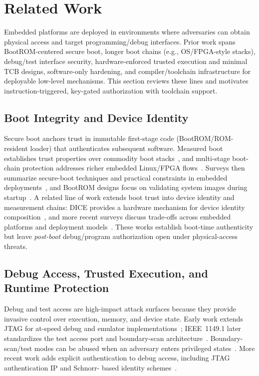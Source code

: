 \section{Related Work}
\label{sec:relatedwork}

Embedded platforms are deployed in environments where adversaries can obtain physical
access and target programming/debug interfaces. Prior work spans BootROM-centered
secure boot, longer boot chains (e.g., OS/FPGA-style stacks), debug/test interface
security, hardware-enforced trusted execution and minimal TCB designs, software-only
hardening, and compiler/toolchain infrastructure for deployable low-level mechanisms.
This section reviews these lines and motivates instruction-triggered, key-gated
authorization with toolchain support.

\subsection{Boot Integrity and Device Identity}
Secure boot anchors trust in immutable first-stage code (BootROM/ROM-resident loader)
that authenticates subsequent software. Measured boot establishes trust properties
over commodity boot stacks~\cite{parno2010bootstrapping}, and multi-stage boot-chain
protection addresses richer embedded Linux/FPGA flows~\cite{devic2011fpga}. Surveys then
summarize secure-boot techniques and practical constraints in embedded
deployments~\cite{rv2018securebootreview}, and BootROM designs focus on validating
system images during startup~\cite{bin2020bootrom}. A related line of work extends boot
trust into device identity and measurement chains: DICE provides a hardware mechanism
for device identity composition~\cite{jaeger2020diceharder}, and more recent surveys
discuss trade-offs across embedded platforms and deployment
models~\cite{wang2022securebootsurvey}. These works establish boot-time authenticity
but leave \emph{post-boot} debug/program authorization open under physical-access
threats.

\subsection{Debug Access, Trusted Execution, and Runtime Protection}
Debug and test access are high-impact attack surfaces because they provide invasive
control over execution, memory, and device state. Early work extends JTAG for at-speed
debug and emulator implementations~\cite{vandelogt2003jtag,chen2008jtagemu}; IEEE~1149.1
later standardizes the test access port and boundary-scan
architecture~\cite{ieee1149_1}. Boundary-scan/test modes can be abused when an adversary
enters privileged states~\cite{ali2014boundaryscanattack}. More recent work adds
explicit authentication to debug access, including JTAG authentication IP and Schnorr-
based identity schemes~\cite{walimbe2014jtagaxi,wang2020schnorrjtag,lapeyre2022jtagauth}.

